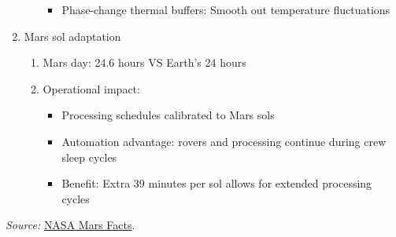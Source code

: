 \documentclass[12pt, a4paper]{article}
\begin{document}
\begin{enumerate}
\begin{enumerate}
\begin{itemize}
            \item Phase-change thermal buffers: Smooth out temperature fluctuations
        \end{itemize}
    \end{enumerate}
    \item Mars sol adaptation
    \begin{enumerate}
        \item Mars day: 24.6 hours VS Earth's 24 hours
        \item Operational impact:
        \begin{itemize}
            \item Processing schedules calibrated to Mars sols
            \item Automation advantage: rovers and processing continue during crew sleep cycles
            \item Benefit: Extra 39 minutes per sol allows for extended processing cycles
        \end{itemize}
    \end{enumerate}
\end{enumerate}

\noindent\textit{Source:} \href{https://science.nasa.gov/mars/facts/}{NASA Mars Facts}.
\end{document}
